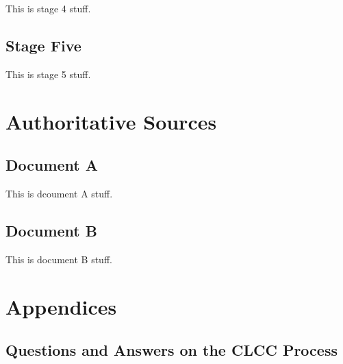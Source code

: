 \documentclass[oneside]{book}
\begin{document}
This is stage 4 stuff.

\chapter{Stage Five}

This is stage 5 stuff.

\part{Authoritative Sources}

\chapter{Document A}

This is dcoument A stuff.

\chapter{Document B}

This is document B stuff.

\backmatter

\setcounter{secnumdepth}{-2}
\part{Appendices}

\chapter{Questions and Answers on the CLCC Process}
\end{document}
